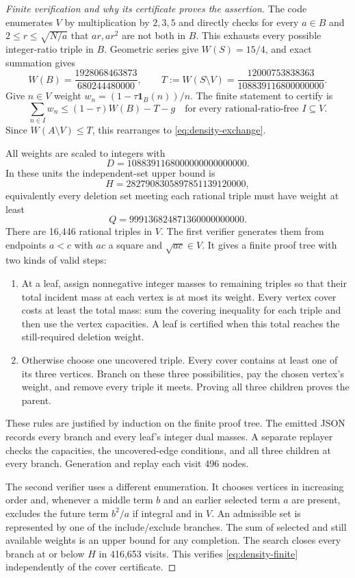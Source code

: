 \begin{proof}[Finite verification and why its certificate proves the assertion]
The code enumerates $V$ by multiplication by $2,3,5$ and directly checks
for every $a\in B$ and $2\le r\le\sqrt{N/a}$ that $ar,ar^2$ are not both
in $B$. This exhausts every possible integer-ratio triple in $B$.
Geometric series give $W(S)=15/4$, and exact summation gives
\[
 W(B)=\frac{1928068463873}{680244480000},\qquad
 T:=W(S\setminus V)=\frac{12000753838363}{108839116800000000}.
\]
Give $n\in V$ weight $w_n=(1-\tau\mathbf1_B(n))/n$.
The finite statement to certify is
\begin{equation}\label{eq:density-finite}
 \sum_{n\in I}w_n\le(1-\tau)W(B)-T-g
 \quad\text{for every rational-ratio-free }I\subseteq V.
\end{equation}
Since $W(A\setminus V)\le T$, this rearranges to
\eqref{eq:density-exchange}.

All weights are scaled to integers with
\[
 D=1088391168000000000000000.
\]
In these units the independent-set upper bound is
\[
 H=2827908305897851139120000,
\]
equivalently every deletion set meeting each rational triple must have weight
at least
\[
 Q=999136824871360000000000.
\]
There are 16,446 rational triples in $V$. The first verifier generates them
from endpoints $a<c$ with $ac$ a square and $\sqrt{ac}\in V$. It gives a
finite proof tree with two kinds of valid steps:
\begin{enumerate}
\item At a leaf, assign nonnegative integer masses to remaining triples so
that their total incident mass at each vertex is at most its weight. Every
vertex cover costs at least the total mass: sum the covering inequality for
each triple and then use the vertex capacities. A leaf is certified when this
total reaches the still-required deletion weight.
\item Otherwise choose one uncovered triple. Every cover contains at least
one of its three vertices. Branch on these three possibilities, pay the chosen
vertex's weight, and remove every triple it meets. Proving all three children
proves the parent.
\end{enumerate}
These rules are justified by induction on the finite proof tree. The emitted
JSON records every branch and every leaf's integer dual masses. A separate
replayer checks the capacities, the uncovered-edge conditions, and all three
children at every branch. Generation and replay each visit 496 nodes.

The second verifier uses a different enumeration. It chooses vertices in
increasing order and, whenever a middle term $b$ and an earlier selected term
$a$ are present, excludes the future term $b^2/a$ if integral and in $V$.
An admissible set is represented by one of the include/exclude branches.
The sum of selected and still available weights is an upper bound for any
completion. The search closes every branch at or below $H$ in 416,653 visits.
This verifies \eqref{eq:density-finite} independently of the cover certificate.


\end{proof}
